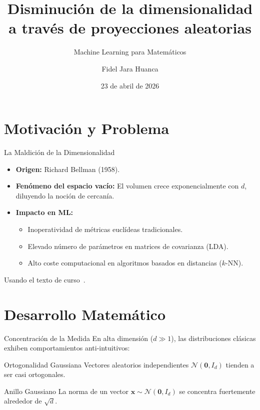 \documentclass[
    12pt,
    aspectratio=1610,
    c,
    spanish,
    intlimits,
    handout,
    leqno,
    professionalfonts,
]{beamer}
\title{Disminución de la dimensionalidad a través de proyecciones aleatorias}
\subtitle{Machine Learning para Matemáticos}
\author{Fidel Jara Huanca}
\institute{Instituto de Matemática y Ciencias Afines}
\date{23 de abril de 2026}
\begin{document}
\frame{\maketitle}

\begin{frame}[label=toc]\transblindsvertical
	\frametitle{\contentsname}
	\tableofcontents[hideallsubsections]
\end{frame}

\section{Motivación y Problema}

\begin{frame}{La Maldición de la Dimensionalidad}
	\begin{itemize}
		\item \textbf{Origen:} Richard Bellman (1958).
		\item \textbf{Fenómeno del espacio vacío:} El volumen crece exponencialmente con $d$, diluyendo la noción de cercanía.
		\item \textbf{Impacto en ML:}
		      \begin{itemize}
			      \item Inoperatividad de métricas euclídeas tradicionales.
			      \item Elevado número de parámetros en matrices de covarianza (LDA).
			      \item Alto coste computacional en algoritmos basados en distancias ($k$-NN).
		      \end{itemize}
	\end{itemize}

	Usando el texto de curso~\cite{Wegner2024}.
	\begin{refsection}
		\nocite{Wegner2024}
		\nocite{Johnson1984}
		\nocite{Dasgupta2003}
		\printbibliography[heading=none]
	\end{refsection}
\end{frame}

\section{Desarrollo Matemático}

\begin{frame}{Concentración de la Medida}
	En alta dimensión ($d \gg 1$), las distribuciones clásicas exhiben comportamientos anti-intuitivos:
	\vfill
	\begin{block}{Ortogonalidad Gaussiana}
		Vectores aleatorios independientes $\mathcal{N}(\symbf{0}, I_d)$ tienden a ser casi ortogonales.
	\end{block}
	\begin{block}{Anillo Gaussiano}
		La norma de un vector $\symbf{x} \sim \mathcal{N}(\symbf{0}, I_d)$ se concentra fuertemente alrededor de $\sqrt{d}$.
	\end{block}
\end{frame}
\end{document}
